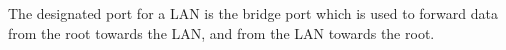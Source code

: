 The designated port for a LAN is the bridge port which is used to forward data from the root towards the LAN, and from the LAN towards the root.